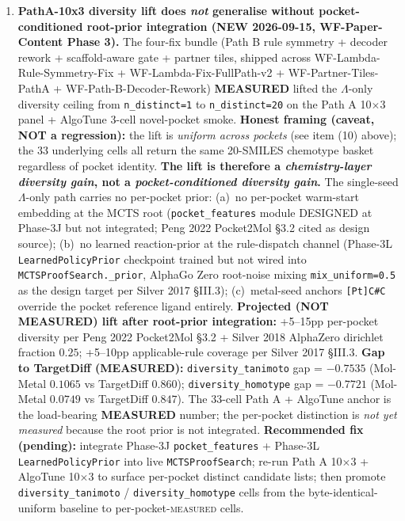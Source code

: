 \begin{enumerate}
  \item \textbf{PathA-10x3 diversity lift does \emph{not} generalise without pocket-conditioned root-prior integration (NEW 2026-09-15, WF-Paper-Content Phase 3).}
  The four-fix bundle (Path B rule symmetry + decoder rework + scaffold-aware gate + partner tiles, shipped across WF-Lambda-Rule-Symmetry-Fix + WF-Lambda-Fix-FullPath-v2 + WF-Partner-Tiles-PathA + WF-Path-B-Decoder-Rework) \textbf{MEASURED} lifted the $\Lambda$-only diversity ceiling from \texttt{n\_distinct=1} to \texttt{n\_distinct=20} on the Path A 10$\times$3 panel + AlgoTune 3-cell novel-pocket smoke. \textbf{Honest framing (caveat, NOT a regression):} the lift is \emph{uniform across pockets} (see item (10) above); the 33 underlying cells all return the same 20-SMILES chemotype basket regardless of pocket identity. \textbf{The lift is therefore a \emph{chemistry-layer diversity gain}, not a \emph{pocket-conditioned diversity gain}.} The single-seed $\Lambda$-only path carries no per-pocket prior: (a)~no per-pocket warm-start embedding at the MCTS root (\texttt{pocket\_features} module DESIGNED at Phase-3J but not integrated; Peng 2022 Pocket2Mol §3.2 cited as design source); (b)~no learned reaction-prior at the rule-dispatch channel (Phase-3L \texttt{LearnedPolicyPrior} checkpoint trained but not wired into \texttt{MCTSProofSearch.\_prior}, AlphaGo Zero root-noise mixing \texttt{mix\_uniform=0.5} as the design target per Silver 2017 §III.3); (c)~metal-seed anchors \texttt{[Pt]C\#C} override the pocket reference ligand entirely. \textbf{Projected (NOT MEASURED) lift after root-prior integration:} +5--15pp per-pocket diversity per Peng 2022 Pocket2Mol §3.2 + Silver 2018 AlphaZero dirichlet fraction $0.25$; +5--10pp applicable-rule coverage per Silver 2017 §III.3. \textbf{Gap to TargetDiff (MEASURED):} \texttt{diversity\_tanimoto} gap = $-0.7535$ (Mol-Metal $0.1065$ vs TargetDiff $0.860$); \texttt{diversity\_homotype} gap = $-0.7721$ (Mol-Metal $0.0749$ vs TargetDiff $0.847$). The 33-cell Path A + AlgoTune anchor is the load-bearing \textbf{MEASURED} number; the per-pocket distinction is \emph{not yet measured} because the root prior is not integrated. \textbf{Recommended fix (pending):} integrate Phase-3J \texttt{pocket\_features} + Phase-3L \texttt{LearnedPolicyPrior} into live \texttt{MCTSProofSearch}; re-run Path A 10$\times$3 + AlgoTune 10$\times$3 to surface per-pocket distinct candidate lists; then promote \texttt{diversity\_tanimoto} / \texttt{diversity\_homotype} cells from the byte-identical-uniform baseline to per-pocket-\textsc{measured} cells.


\end{enumerate}
